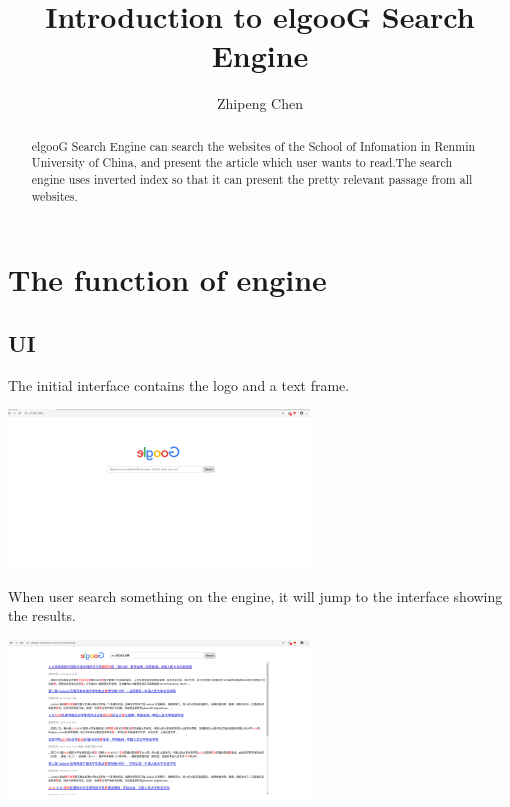 \documentclass[a4paper]{article}
\title{Introduction to elgooG Search Engine}
\author{Zhipeng Chen}
\begin{document}
\maketitle

\begin{abstract}
	
	elgooG Search Engine can search the websites of the School of Infomation in Renmin University of China, and present the article which user wants to read.The search engine uses inverted index so that it can present the pretty relevant passage from all websites.
	
\end{abstract}

\section{The function of engine}
	
	\subsection{UI}
	
		The initial interface contains the logo and a text frame. 
		
		\begin{center}
		\includegraphics[width=0.6\textwidth, height=0.2\textheight]{UI-1.png}
		\end{center}
		
		When user search something on the engine, it will jump to the interface showing the results.
		
		\begin{center}
		\includegraphics[width=0.6\textwidth, height=0.2\textheight]{UI-2.png}
		\end{center}
	
\end{document}
